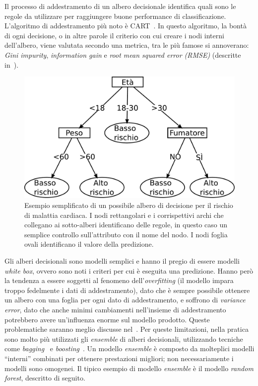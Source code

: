 Il processo di addestramento di un albero decisionale identifica quali sono le regole da utilizzare per raggiungere buone performance di classificazione. 
L'algoritmo di addestramento più noto è CART~\cite{cart}. 
In questo algoritmo, la bontà di ogni decisione, o in altre parole il criterio con cui creare i nodi interni dell'albero, viene valutata secondo una metrica, tra le più famose si annoverano: \emph{Gini impurity}, \emph{information gain} e \emph{root mean squared error (RMSE)} (descritte in~\cite{cart}). 
\begin{figure}
    \centering
    \includegraphics[width=0.7\linewidth]{img/decision_tree.pdf}
    \caption[Esempio albero di decisione.]{Esempio semplificato di un possibile albero di decisione per il rischio di malattia cardiaca. I nodi rettangolari e i corrispettivi archi che collegano ai sotto-alberi identificano delle regole, in questo caso un semplice controllo sull'attributo con il nome del nodo. I nodi foglia ovali identificano il valore della predizione.}
    \label{fig:decision_tree}
\end{figure}
Gli alberi decisionali sono modelli semplici e hanno il pregio di essere modelli \emph{white box}, ovvero sono noti i criteri per cui è eseguita una predizione.
Hanno però la tendenza a essere soggetti al fenomeno dell'\emph{overfitting} (il modello impara troppo fedelmente i dati di addestramento), dato che è sempre possibile ottenere un albero con una foglia per ogni dato di addestramento, e soffrono di \emph{variance error}, dato che anche minimi cambiamenti nell'insieme di addestramento potrebbero avere un'influenza enorme sul modello prodotto.
Queste problematiche saranno meglio discusse nel~.
Per queste limitazioni, nella pratica sono molto più utilizzati gli \emph{ensemble} di alberi decisionali, utilizzando tecniche come \emph{bagging}~\cite{bagging_predictors} e \emph{boosting}~\cite{adaboost}.
Un modello \emph{ensemble} è composto da molteplici modelli ``interni'' combinati per ottenere prestazioni migliori; non necessariamente i modelli sono omogenei.
Il tipico esempio di modello \emph{ensemble} è il modello \emph{random forest}, descritto di seguito.

